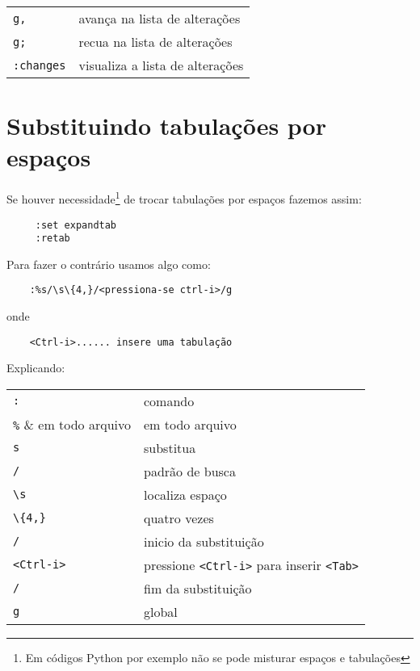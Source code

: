 \begin{table}[htb]\begin{center} \begin{tabular}{ll} \hline
     \verb|g,| &  avança na lista de alterações\\
     \verb|g;| & recua na lista de alterações\\
     \verb|:changes| & visualiza a lista de alterações\\
\hline \end{tabular}\end{center}\end{table}

\section{Substituindo tabulações por espaços}
\label{sec:Substituindo tabulações por espaços}

Se houver necessidade\footnote{Em códigos Python por exemplo não se pode
misturar espaços e tabulações} de trocar tabulações por espaços
fazemos assim:

\begin{verbatim}
	 :set expandtab
	 :retab
\end{verbatim}

Para fazer o contrário usamos algo como:

\begin{verbatim}
    :%s/\s\{4,}/<pressiona-se ctrl-i>/g
\end{verbatim}
onde
\begin{verbatim}
    <Ctrl-i>...... insere uma tabulação
\end{verbatim}

Explicando:
\begin{table}[htb]\begin{center} \begin{tabular}{ll} \hline
    \verb|:| & comando\\
    \verb|%| & em todo arquivo \\
    \verb|s| & substitua \\
    \verb|/| & padrão de busca\\
    \verb|\s| & localiza espaço\\
    \verb|\{4,}| & quatro vezes\\
    \verb|/| & inicio da substituição\\
    \verb|<Ctrl-i>| & pressione \verb|<Ctrl-i>| para inserir \verb|<Tab>|\\
    \verb|/| & fim da substituição\\
    \verb|g| & global\\
\hline \end{tabular}\end{center}\end{table}

